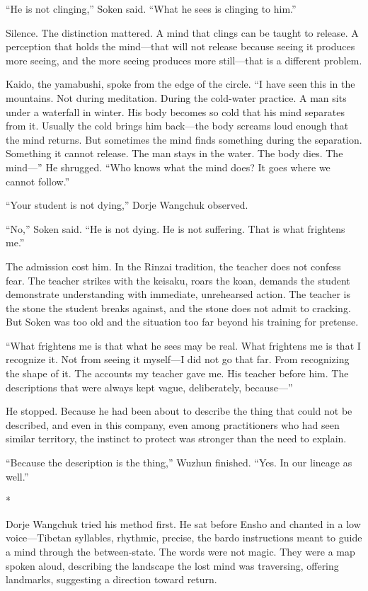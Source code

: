 ``He is not clinging,'' Soken said. ``What he sees is clinging to him.''

Silence. The distinction mattered. A mind that clings can be taught to release. A perception that holds the mind---that will not release because seeing it produces more seeing, and the more seeing produces more still---that is a different problem.

Kaido, the yamabushi, spoke from the edge of the circle. ``I have seen this in the mountains. Not during meditation. During the cold-water practice. A man sits under a waterfall in winter. His body becomes so cold that his mind separates from it. Usually the cold brings him back---the body screams loud enough that the mind returns. But sometimes the mind finds something during the separation. Something it cannot release. The man stays in the water. The body dies. The mind---'' He shrugged. ``Who knows what the mind does? It goes where we cannot follow.''

``Your student is not dying,'' Dorje Wangchuk observed.

``No,'' Soken said. ``He is not dying. He is not suffering. That is what frightens me.''

The admission cost him. In the Rinzai tradition, the teacher does not confess fear. The teacher strikes with the keisaku, roars the koan, demands the student demonstrate understanding with immediate, unrehearsed action. The teacher is the stone the student breaks against, and the stone does not admit to cracking. But Soken was too old and the situation too far beyond his training for pretense.

``What frightens me is that what he sees may be real. What frightens me is that I recognize it. Not from seeing it myself---I did not go that far. From recognizing the shape of it. The accounts my teacher gave me. His teacher before him. The descriptions that were always kept vague, deliberately, because---''

He stopped. Because he had been about to describe the thing that could not be described, and even in this company, even among practitioners who had seen similar territory, the instinct to protect was stronger than the need to explain.

``Because the description is the thing,'' Wuzhun finished. ``Yes. In our lineage as well.''

\begin{center}
*\quad*\quad*
\end{center}

Dorje Wangchuk tried his method first. He sat before Ensho and chanted in a low voice---Tibetan syllables, rhythmic, precise, the bardo instructions meant to guide a mind through the between-state. The words were not magic. They were a map spoken aloud, describing the landscape the lost mind was traversing, offering landmarks, suggesting a direction toward return.

